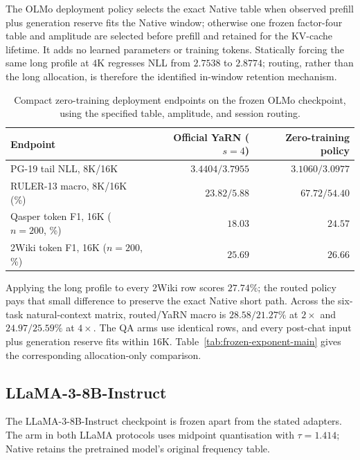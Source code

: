 The OLMo deployment policy selects the exact Native table when observed prefill plus generation
reserve fits the Native window; otherwise one frozen factor-four table and
amplitude are selected before prefill and retained for the KV-cache lifetime.
It adds no learned parameters or training tokens. Statically forcing the same
long profile at $4$K regresses NLL from $2.7538$ to $2.8774$; routing, rather
than the long allocation, is therefore the identified in-window retention
mechanism.

\begin{table}[ht]
\caption{Compact zero-training deployment endpoints on the frozen OLMo
checkpoint, using the specified table, amplitude, and session routing.}
\label{tab:zero-training-policy-endpoints}
\centering
\small
\begin{tabular}{@{}lrr@{}}
\toprule
Endpoint & Official YaRN ($s{=}4$) & Zero-training policy \\
\midrule
PG-19 tail NLL, 8K/16K & $3.4404/3.7955$ & $\mathbf{3.1060/3.0977}$ \\
RULER-13 macro, 8K/16K (\%) & $23.82/5.88$ & $\mathbf{67.72/54.40}$ \\
Qasper token F1, 16K ($n{=}200$, \%) & $18.03$ & $\mathbf{24.57}$ \\
2Wiki token F1, 16K ($n{=}200$, \%) & $25.69$ & $\mathbf{26.66}$ \\
\bottomrule
\end{tabular}
\end{table}

Applying the long profile to every 2Wiki row scores $27.74\%$; the routed policy
pays that small difference to preserve the exact Native short path. Across the
six-task natural-context matrix, routed/YaRN macro is $28.58/21.27\%$ at
$2\times$ and $24.97/25.59\%$ at $4\times$. The QA arms use identical rows,
and every post-chat input plus generation reserve fits within $16$K.
Table~\ref{tab:frozen-exponent-main} gives the corresponding
allocation-only comparison.

\FloatBarrier
\subsection{LLaMA-3-8B-Instruct}
\label{sec:llama8b}

The LLaMA-3-8B-Instruct checkpoint \citep{grattafiori2024llama3} is frozen
apart from the stated adapters. The \evq{} arm in both LLaMA protocols uses midpoint quantisation with
$\tau{=}1.414$; Native retains the pretrained model's original frequency table.

